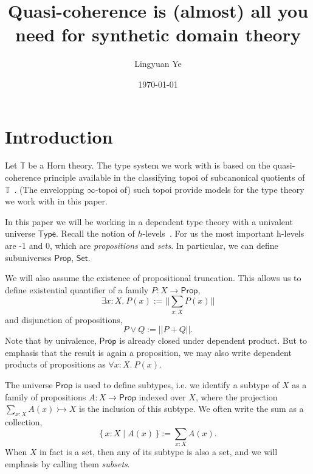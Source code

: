 \documentclass[12pt]{amsart}
\title{Quasi-coherence is (almost) all you need for synthetic domain theory}
\author{Lingyuan Ye}
\date{\today}
\theoremstyle{definition}
\newcommand{\mbb}[1]{\mathbb{#1}}
\newcommand{\T}{\mbb T}
\newcommand{\ms}[1]{\mathsf{#1}}
\newcommand{\scomp}[2]{\{\,#1\mid#2\,\}}
\newcommand{\inj}{\rightarrowtail}
\newcommand{\fa}[2]{\forall #1\!\colon\!\!#2.\ }
\newcommand{\ex}[2]{\exists #1\!\colon\!\!#2.\ }
\newcommand{\pss}[1]{||#1||} %
\newcommand{\tp}{\ms{Type}}
\newcommand{\pp}{\ms{Prop}}
\newcommand{\st}{\ms{Set}}
\begin{document}
%

%
%

%
%

%
\maketitle              %
%

\section{Introduction}

Let $\T$ be a Horn theory. The type system we work with is based on the quasi-coherence principle available in the classifying topoi of subcanonical quotients of $\T$~\cite{blechschmidt2021using,blechschmidt2020general}. (The envelopping $\infty$-topoi of) such topoi provide models for the type theory we work with in this paper.

In this paper we will be working in a dependent type theory with a univalent universe $\tp$. Recall the notion of $h$-levels~\cite{hottbook}. For us the most important h-levels are -1 and 0, which are \emph{propositions} and \emph{sets}. In particular, we can define subuniverses $\pp$, $\st$.

We will also assume the existence of propositional truncation. This allows us to define existential quantifier of a family $P : X \to \pp$, 
\[ \ex x{X} P(x) := \pss{\sum_{x:X}P(x)} \] 
and disjunction of propositions,
\[ P \vee Q := \pss{P + Q}. \]
Note that by univalence, $\pp$ is already closed under dependent product. But to emphasis that the result is again a proposition, we may also write dependent products of propositions as $\fa xX P(x)$. 

The universe $\pp$ is used to define subtypes, i.e. we identify a subtype of $X$ as a family of propositions $A : X \to \pp$ indexed over $X$, where the projection $\sum_{x:X}A(x) \inj X$ is the inclusion of this subtype. We often write the sum as a collection,
\[ \scomp{x:X}{A(x)} := \sum_{x:X}A(x). \]
When $X$ in fact is a set, then any of its subtype is also a set, and we will emphasis by calling them \emph{subsets}.
\end{document}
